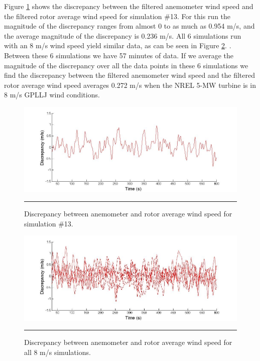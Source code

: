Figure \ref{fig2-9} shows the discrepancy between the filtered anemometer wind speed and the filtered rotor average wind speed for simulation \#13. For this run the magnitude of the discrepancy ranges from almost 0 to as much as 0.954 m/s, and the average magnitude of the discrepancy is 0.236 m/s. All 6 simulations run with an 8 m/s wind speed yield similar data, as can be seen in Figure \ref{fig2-10}. . Between these 6 simulations we have 57 minutes of data. If we average the magnitude of the discrepancy over all the data points in these 6 simulations we find the discrepancy between the filtered anemometer wind speed and the filtered rotor average wind speed averages 0.272 m/s when the NREL 5-MW turbine is in 8 m/s GPLLJ wind conditions.

\begin{figure}[htbp]
	\centering
		\includegraphics[trim = {3cm 0 2.5cm 0}, clip, width = \linewidth]{Figures/ch2Figures/fig2-9.jpg}
		\rule{35em}{0.5pt}
	\caption{Discrepancy between anemometer and rotor average wind speed for simulation \#13.}
	\label{fig2-9}
\end{figure}

\begin{figure}[htbp]
	\centering
		\includegraphics[trim = {3cm 0 2.5cm 0}, clip, width = \linewidth]{Figures/ch2Figures/fig2-10.jpg}
		\rule{35em}{0.5pt}
	\caption{Discrepancy between anemometer and rotor average wind speed for all 8 m/s simulations.}
	\label{fig2-10}
\end{figure}


